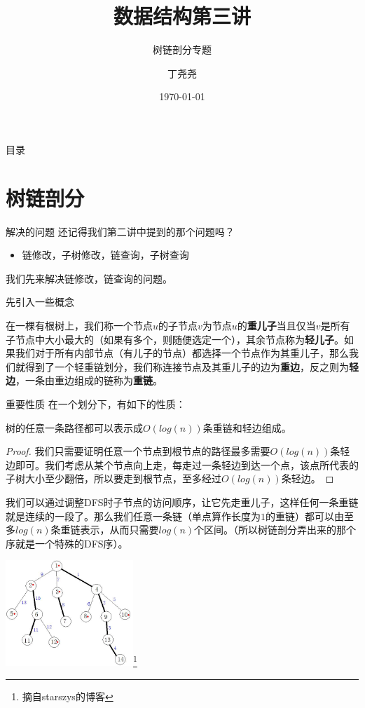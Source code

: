 \documentclass{beamer}
\title{数据结构第三讲}
\subtitle{树链剖分专题}
\author{丁尧尧}
\institute{上海交通大学}
\date{\today}
\begin{document}
	\maketitle
	\begin{frame}{目录}
		\tableofcontents
	\end{frame}
	\section{树链剖分}
		\begin{frame}{解决的问题}
			还记得我们第二讲中提到的那个问题吗？
			\begin{itemize}
				\item 链修改，子树修改，链查询，子树查询
			\end{itemize}
			我们先来解决链修改，链查询的问题。
		\end{frame}
		\begin{frame}{先引入一些概念}
			\begin{definition}
				在一棵有根树上，我们称一个节点$u$的子节点$v$为节点$u$的\textbf{重儿子}当且仅当$v$是所有子节点中大小最大的（如果有多个，则随便选定一个），其余节点称为\textbf{轻儿子}。如果我们对于所有内部节点（有儿子的节点）都选择一个节点作为其重儿子，那么我们就得到了一个轻重链划分，我们称连接节点及其重儿子的边为\textbf{重边}，反之则为\textbf{轻边}，一条由重边组成的链称为\textbf{重链}。
			\end{definition}
		\end{frame}
		\begin{frame}{重要性质}
			在一个划分下，有如下的性质：
			\begin{theorem}
				树的任意一条路径都可以表示成$O(log(n))$条重链和轻边组成。
			\end{theorem}
			\begin{proof}
				我们只需要证明任意一个节点到根节点的路径最多需要$O(log(n))$条轻边即可。我们考虑从某个节点向上走，每走过一条轻边到达一个点，该点所代表的子树大小至少翻倍，所以要走到根节点，至多经过$O(log(n))$条轻边。
			\end{proof}
		\end{frame}
		\begin{frame}
			我们可以通过调整DFS时子节点的访问顺序，让它先走重儿子，这样任何一条重链就是连续的一段了。那么我们任意一条链（单点算作长度为$1$的重链）都可以由至多$log(n)$条重链表示，从而只需要$log(n)$个区间。（所以树链剖分弄出来的那个序就是一个特殊的DFS序）。
			
			
			\includegraphics[height=4cm]{tdcp.jpeg}\footnote{摘自starszys的博客}
		\end{frame}
\end{document}
